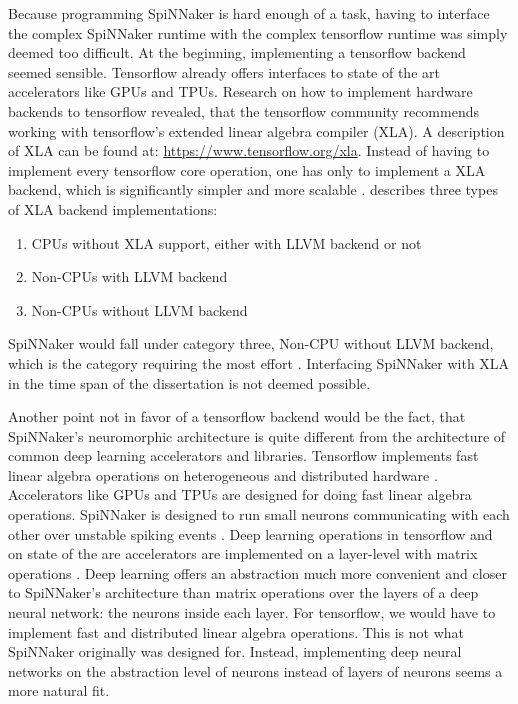 \documentclass{article}
\begin{document}
Because programming SpiNNaker is hard enough of a task,
having to interface the complex SpiNNaker runtime with the
complex tensorflow runtime was simply deemed too difficult.
At the beginning, implementing a tensorflow backend seemed
sensible.
Tensorflow already offers interfaces to state of the art
accelerators like GPUs and TPUs.
Research on how to implement hardware backends to
tensorflow revealed, that the tensorflow community
recommends working with tensorflow's extended linear
algebra compiler (XLA).
A description of XLA can be found at:
\url{https://www.tensorflow.org/xla}.
Instead of having to implement every tensorflow core
operation, one has only to implement a XLA backend, which
is significantly simpler and more scalable
\citep{xla_backend}.
\citet{xla_backend} describes three types of XLA backend
implementations:
\begin{enumerate}
  \item CPUs without XLA support, either with LLVM backend
    or not
  \item Non-CPUs with LLVM backend
  \item Non-CPUs without LLVM backend
\end{enumerate}
SpiNNaker would fall under category three, Non-CPU without
LLVM backend, which is the category requiring the most
effort \citep{xla_backend}.
Interfacing SpiNNaker with XLA in the time span of the
dissertation is not deemed possible.

Another point not in favor of a tensorflow backend would be
the fact, that SpiNNaker's neuromorphic architecture is
quite different from the architecture of common deep
learning accelerators and libraries.
Tensorflow implements fast linear algebra operations on
heterogeneous and distributed hardware \citep{tf2015}.
Accelerators like GPUs and TPUs are designed for doing
fast linear algebra operations.
SpiNNaker is designed to run small neurons communicating
with each other over unstable spiking events
\citep{furber_et_al_2007}.
Deep learning operations in tensorflow and on state of the
are accelerators are implemented on a layer-level with
matrix operations \citep{goodfellow2016}.
Deep learning offers an abstraction much more convenient
and closer to SpiNNaker's architecture than matrix
operations over the layers of a deep neural network: the
neurons inside each layer.
For tensorflow, we would have to implement fast and
distributed linear algebra operations.
This is not what SpiNNaker originally was designed for.
Instead, implementing deep neural networks on the
abstraction level of neurons instead of layers of neurons
seems a more natural fit.
\end{document}
